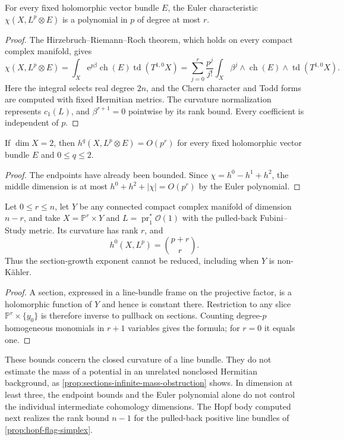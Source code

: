 \begin{proposition}\label{prop:curvature-rank-euler-polynomial}
For every fixed holomorphic vector bundle $E$, the Euler characteristic $\chi(X,L^p\otimes E)$ is a polynomial in $p$ of degree at most $r$.
\end{proposition}
\begin{proof}
The Hirzebruch--Riemann--Roch theorem, which holds on every compact complex manifold, gives
\[
 \chi(X,L^p\otimes E)
 =\int_X\mathrm e^{p\beta}\operatorname{ch}(E)
                              \operatorname{td}(T^{1,0}X)
 =\sum_{j=0}^{r}\frac{p^j}{j!}
       \int_X\beta^j\wedge\operatorname{ch}(E)
                              \wedge\operatorname{td}(T^{1,0}X).
\]
Here the integral selects real degree $2n$, and the Chern character and Todd forms are computed with fixed Hermitian metrics. The curvature normalization represents $c_1(L)$, and $\beta^{r+1}=0$ pointwise by its rank bound. Every coefficient is independent of $p$.
\end{proof}

\begin{corollary}\label{cor:surface-curvature-rank-cohomology}
If $\dim X=2$, then $h^q(X,L^p\otimes E)=O(p^r)$ for every fixed holomorphic vector bundle $E$ and $0\leq q\leq2$.
\end{corollary}
\begin{proof}
The endpoints have already been bounded. Since $\chi=h^0-h^1+h^2$, the middle dimension is at most $h^0+h^2+|\chi|=O(p^r)$ by the Euler polynomial.
\end{proof}

\begin{example}\label{ex:curvature-rank-sharp-section-growth}
Let $0\leq r\leq n$, let $Y$ be any connected compact complex manifold of dimension $n-r$, and take $X=\mathbb P^r\times Y$ and $L=\operatorname{pr}_1^*\mathcal O(1)$ with the pulled-back Fubini--Study metric. Its curvature has rank $r$, and
\[
 h^0(X,L^p)=\binom{p+r}{r}.
\]
Thus the section-growth exponent cannot be reduced, including when $Y$ is non-K\"ahler.
\end{example}
\begin{proof}
A section, expressed in a line-bundle frame on the projective factor, is a holomorphic function of $Y$ and hence is constant there. Restriction to any slice $\mathbb P^r\times\{y_0\}$ is therefore inverse to pullback on sections. Counting degree-$p$ homogeneous monomials in $r+1$ variables gives the formula; for $r=0$ it equals one.
\end{proof}

These bounds concern the closed curvature of a line bundle. They do not estimate the mass of a potential in an unrelated nonclosed Hermitian background, as \cref{prop:sections-infinite-mass-obstruction} shows. In dimension at least three, the endpoint bounds and the Euler polynomial alone do not control the individual intermediate cohomology dimensions. The Hopf body computed next realizes the rank bound $n-1$ for the pulled-back positive line bundles of \cref{prop:hopf-flag-simplex}.
